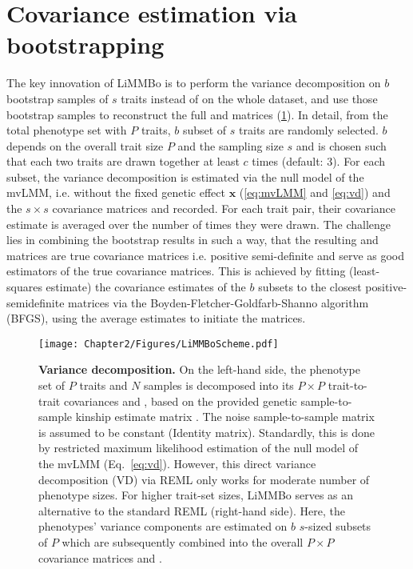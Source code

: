 \section{Covariance estimation via bootstrapping}
\label{section:bootstrapping-limmbo}
The key innovation of LiMMBo is to perform the variance decomposition on \(b\) bootstrap samples of \(s\) traits instead of on the whole dataset, and use those bootstrap samples to reconstruct the full  and  matrices (\cref{fig:vd}). In detail, from the total phenotype set with \(P\) traits, \(b\) subset of \(s\) traits are randomly selected. \(b\) depends on the overall trait size \(P\) and the sampling size \(s\) and is chosen such that each two traits are drawn together at least \(c\) times (default: 3). For each subset, the variance decomposition is estimated via the null model of the mvLMM, i.e. without the fixed genetic effect \(\mathbf{x}\) (\cref{eq:mvLMM} and \cref{eq:vd}) and the $s \times s$ covariance matrices  and recorded.  For each trait pair, their covariance estimate is averaged over the number of times they were drawn. The challenge lies in combining the bootstrap results in such a way, that the resulting  and  matrices are true covariance matrices i.e. positive semi-definite and serve as good estimators of the true covariance matrices. This is achieved by fitting (least-squares estimate) the covariance estimates of the \(b\) subsets to the closest positive-semidefinite matrices via the Boyden-Fletcher-Goldfarb-Shanno algorithm (BFGS)\citep{Byrd1995}, using the average estimates to initiate the matrices. 

\begin{figure}[hbtp]
	\centering
	\texttt{[image: Chapter2/Figures/LiMMBoScheme.pdf]}
	\caption[\textbf{Variance decomposition.}]{\textbf{Variance decomposition.} On the left-hand side, the phenotype set of \(P\) traits and \(N\) samples is decomposed into its \(P \times P\) trait-to-trait covariances  and , based on the provided genetic sample-to-sample kinship estimate matrix . The noise sample-to-sample matrix is assumed to be constant (Identity matrix). Standardly, this is done by restricted maximum likelihood estimation of the null model of the mvLMM (Eq.~\ref{eq:vd}). However, this direct variance decomposition (VD) via REML only works for moderate number of phenotype sizes. For higher trait-set sizes, LiMMBo serves as an alternative to the standard REML (right-hand side). Here, the phenotypes' variance components are estimated on \(b\) \(s\)-sized subsets of \(P\) which are subsequently combined into the overall \(P \times P\) covariance matrices  and .} 
	 	\label{fig:vd}
\end{figure}


